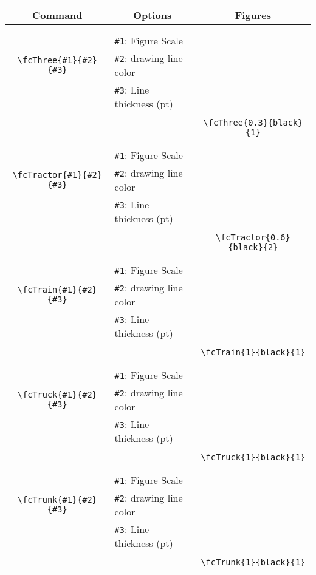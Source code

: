 \documentclass[x11names]{article}
\begin{document}
\begin{table}[H]\centering\begin{tabular}{|c|l|c|}\hline {\bf Command}& \multicolumn{1}{c|}{{\bf Options}} & {\bf Figures}\\  \hline	&&\multirow{5}{*}{\fcThree{0.3}{black}{1}}\\	&&\\	&\verb|#1|: Figure Scale &\\	\verb|\fcThree{#1}{#2}{#3}|&	\verb|#2|: drawing line color &\\	&\verb|#3|: Line thickness (pt) &\\ &&\\&&	\verb|\fcThree{0.3}{black}{1}|\\\hline 	
	&&\multirow{5}{*}{\fcTractor{0.6}{black}{2}}\\	&&\\	&\verb|#1|: Figure Scale &\\	\verb|\fcTractor{#1}{#2}{#3}|&	\verb|#2|: drawing line color &\\	&\verb|#3|: Line thickness (pt) &\\ &&\\&&	\verb|\fcTractor{0.6}{black}{2}|\\\hline 	
	&&\multirow{5}{*}{\fcTrain{1}{black}{1}}\\	&&\\	&\verb|#1|: Figure Scale &\\	\verb|\fcTrain{#1}{#2}{#3}|&	\verb|#2|: drawing line color &\\	&\verb|#3|: Line thickness (pt) &\\ &&\\&&	\verb|\fcTrain{1}{black}{1}|\\\hline 	
	&&\multirow{5}{*}{\fcTruck{1}{black}{1}}\\	&&\\	&\verb|#1|: Figure Scale &\\	\verb|\fcTruck{#1}{#2}{#3}|&	\verb|#2|: drawing line color &\\	&\verb|#3|: Line thickness (pt) &\\ &&\\&&	\verb|\fcTruck{1}{black}{1}|\\\hline 	
	&&\multirow{5}{*}{\fcTrunk{1}{black}{1}}\\	&&\\	&\verb|#1|: Figure Scale &\\	\verb|\fcTrunk{#1}{#2}{#3}|&	\verb|#2|: drawing line color &\\	&\verb|#3|: Line thickness (pt) &\\ &&\\&&	\verb|\fcTrunk{1}{black}{1}|\\\hline 	

\end{tabular}
\end{table}
\end{document}
